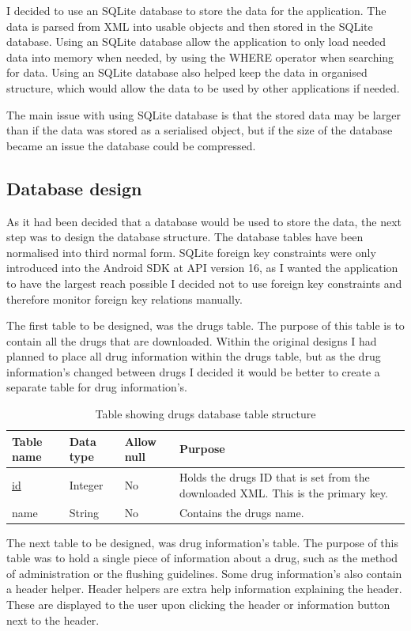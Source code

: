 I decided to use an SQLite database \cite{sqlite} to store the data for the application. The data is parsed from XML \cite{xml} into usable objects and then stored in the SQLite database. Using an SQLite database allow the application to only load needed data into memory when needed, by using the WHERE operator when searching for data. Using an SQLite database also helped keep the data in organised structure, which would allow the data to be used by other applications if needed. 

The main issue with using SQLite database \cite{sqlite} is that the stored data may be larger than if the data was stored as a serialised object, but if the size of the database became an issue the database could be compressed.

\subsection{Database design}
As it had been decided that a database would be used to store the data, the next step was to design the database structure. The database tables have been normalised into third normal form. SQLite foreign key constraints were only introduced into the Android SDK \cite{android_sdk} at API version 16, as I wanted the application to have the largest reach possible I decided not to use foreign key constraints and therefore monitor foreign key relations manually. 

The first table to be designed, was the drugs table. The purpose of this table is to contain all the drugs that are downloaded. Within the original designs I had planned to place all drug information within the drugs table, but as the drug information’s changed between drugs I decided it would be better to create a separate table for drug information’s.

\begin{center}
\begin{longtable}{|l|l|l|p{8cm}|}
\caption{Table showing drugs database table structure}\tabularnewline
\hline
\textbf{Table name} & \textbf{Data type} & \textbf{Allow null} & \textbf{Purpose}                                                                 \\ \hline
\uline{id}                  & Integer            & No                  & Holds the drugs ID that is set from the downloaded XML. This is the primary key. \\ \hline
name                & String             & No                  & Contains the drugs name.                                                         \\ \hline
\end{longtable}
\end{center}
The next table to be designed, was drug information’s table. The purpose of this table was to hold a single piece of information about a drug, such as the method of administration or the flushing guidelines. Some drug information’s also contain a header helper. Header helpers are extra help information explaining the header. These are displayed to the user upon clicking the header or information button next to the header.

